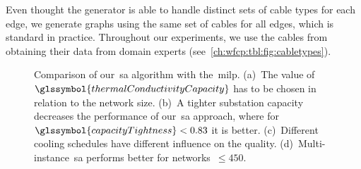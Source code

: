 Even thought the generator is able to handle distinct sets of cable types for
each edge, we generate graphs using the same set of cables for all edges, which
is standard in practice. Throughout our experiments, we use the cables
from~\textcite{berzan} obtaining their data from domain experts
(see~\cref{ch:wfcp:tbl:fig:cabletypes}).
% 
\begin{figure}[tb!]
    \begin{subfigure}{.48\textwidth}
        \vspace*{-0.465cm}\caption{}
        \label{fig:tau-performance-influence}
    \end{subfigure}\hfill%
    \begin{subfigure}{.48\textwidth}
        \vspace*{-0.465cm}\caption{}
        \label{fig:tightness-performance-influence}
    \end{subfigure}

    \begin{subfigure}{.48\textwidth}
        \vspace*{-0.465cm}\caption{}
        \label{fig:cooling-schedule-SA-performance}
    \end{subfigure}\hfill%
    \begin{subfigure}{.48\textwidth}
        \vspace*{-0.465cm}\caption{}
        \label{fig:multi-SA-instances-performance}
    \end{subfigure}
    \caption[Comparison of our~\gls{sa} algorithm with
    the~\gls{milp}.]{Comparison of our~\gls{sa} algorithm with the~\gls{milp}.
    (a)~The value of~$\glssymbol{thermalConductivityCapacity}$ has to be chosen
    in relation to the network size. (b)~A tighter substation capacity decreases
    the performance of our~\gls{sa} approach, where
    for~$\glssymbol{capacityTightness}<0.83$ it is better. (c)~Different cooling
    schedules have different influence on the quality.
    (d)~Multi-instance~\gls{sa} performs better for networks~$\leq 450$.}
    \label{fig:SA-plots}
\end{figure}
%
